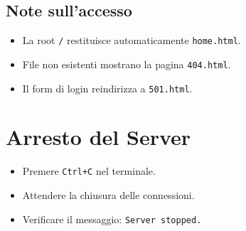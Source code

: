 \documentclass[a4paper,12pt]{report}
\begin{document}
\subsection{Note sull'accesso}

\begin{itemize}
    \item La root \texttt{/} restituisce automaticamente \texttt{home.html}.
    \item File non esistenti mostrano la pagina \texttt{404.html}.
    \item Il form di login reindirizza a \texttt{501.html}.
\end{itemize}

\section{Arresto del Server}

\begin{itemize}
    \item Premere \texttt{Ctrl+C} nel terminale.
    \item Attendere la chiusura delle connessioni.
    \item Verificare il messaggio: \texttt{Server stopped.}
\end{itemize}
\end{document}
